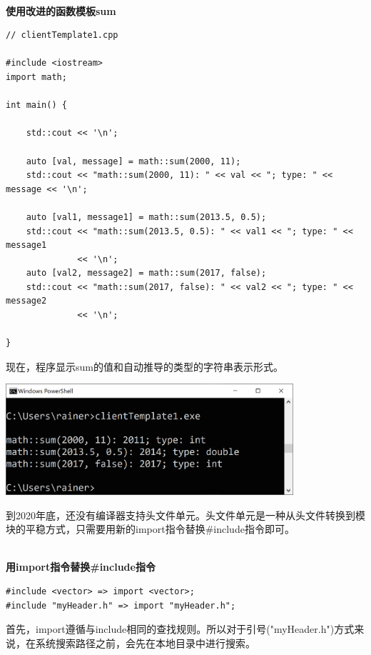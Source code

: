 \hspace*{\fill} \\ %
\noindent
\textbf{使用改进的函数模板sum}
\begin{lstlisting}[style=styleCXX]
// clientTemplate1.cpp

#include <iostream>
import math;

int main() {
	
	std::cout << '\n';
	
	auto [val, message] = math::sum(2000, 11);
	std::cout << "math::sum(2000, 11): " << val << "; type: " << message << '\n';
	
	auto [val1, message1] = math::sum(2013.5, 0.5);
	std::cout << "math::sum(2013.5, 0.5): " << val1 << "; type: " << message1
			  << '\n';
	auto [val2, message2] = math::sum(2017, false);
	std::cout << "math::sum(2017, false): " << val2 << "; type: " << message2
			  << '\n';

}
\end{lstlisting}

现在，程序显示sum的值和自动推导的类型的字符串表示形式。

\begin{center}
\includegraphics[width=0.8\textwidth]{content/3/chapter4/images/25.png}\\
\end{center}


到2020年底，还没有编译器支持头文件单元。头文件单元是一种从头文件转换到模块的平稳方式，只需要用新的import指令替换\#include指令即可。

\hspace*{\fill} \\ %
\noindent
\textbf{用import指令替换\#include指令}
\begin{lstlisting}[style=styleCXX]
#include <vector> => import <vector>;
#include "myHeader.h" => import "myHeader.h";
\end{lstlisting}

首先，import遵循与include相同的查找规则。所以对于引号("myHeader.h")方式来说，在系统搜索路径之前，会先在本地目录中进行搜索。

